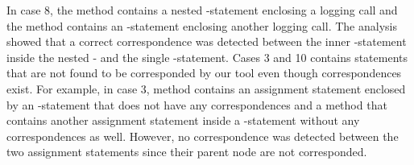 In case 8, the  method contains a nested -statement enclosing a logging call and the  method contains an -statement enclosing another logging call. The analysis showed that a correct correspondence was detected between the inner -statement inside the nested - and the single -statement. Cases 3 and 10 contains statements that are not found to be corresponded by our tool even though correspondences exist. For example, in case 3,  method contains an assignment statement enclosed by an -statement that does not have any correspondences and a  method that contains another assignment statement inside a -statement without any correspondences as well. However, no correspondence was detected between the two assignment statements since their parent node are not corresponded.



